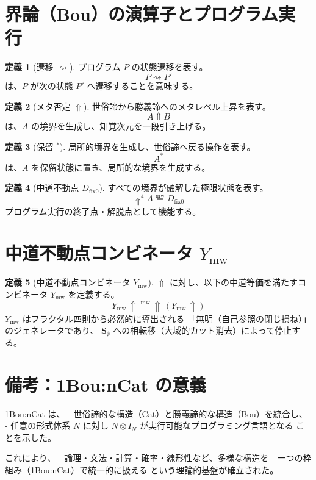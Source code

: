 \documentclass[11pt,a4paper]{article}
\theoremstyle{definition}
\newtheorem{definition}{定義}[section]
\newcommand{\dfix}{D_{\mathrm{fix}0}} %
\newcommand{\mweq}{\mathrel{\overset{\mathrm{mw}}{=}}}
\newcommand{\metanegation}{\Uparrow}
\newcommand{\Svoid}{\mathbf{S}_{\emptyset}}
\newcommand{\Leadsto}{\rightsquigarrow}
\newcommand{\susp}[1]{#1^*}
\newcommand{\Rmw}{Y_{\mathrm{mw}}}
\begin{document}
\section{界論（Bou）の演算子とプログラム実行}

\begin{definition}[遷移 $\Leadsto$]
プログラム $P$ の状態遷移を表す。
$$P \Leadsto P'$$
は、$P$ が次の状態 $P'$ へ遷移することを意味する。
\end{definition}

\begin{definition}[メタ否定 $\metanegation$]
世俗諦から勝義諦へのメタレベル上昇を表す。
$$A \metanegation B$$
は、$A$ の境界を生成し、知覚次元を一段引き上げる。
\end{definition}

\begin{definition}[保留 $\susp{}$]
局所的境界を生成し、世俗諦へ戻る操作を表す。
$$\susp{A}$$
は、$A$ を保留状態に置き、局所的な境界を生成する。
\end{definition}

\begin{definition}[中道不動点 $\dfix$]
すべての境界が融解した極限状態を表す。
$$\metanegation^4 A \mweq \dfix$$
プログラム実行の終了点・解脱点として機能する。
\end{definition}

\section{中道不動点コンビネータ $\Rmw$}

\begin{definition}[中道不動点コンビネータ $\Rmw$]
$\metanegation$ に対し、以下の中道等価を満たすコンビネータ $\Rmw$ を定義する。
$$\Rmw\, \metanegation \mweq \metanegation\,(\Rmw\, \metanegation)$$
$\Rmw$ はフラクタル四則から必然的に導出される
「無明（自己参照の閉じ損ね）」のジェネレータであり、
$\Svoid$ への相転移（大域的カット消去）によって停止する。
\end{definition}

\section*{備考：1Bou:nCat の意義}

1Bou:nCat は、
- 世俗諦的な構造（Cat）と勝義諦的な構造（Bou）を統合し、
- 任意の形式体系 $N$ に対し $N \otimes I_N$ が実行可能なプログラミング言語となる
ことを示した。

これにより、
- 論理・文法・計算・確率・線形性など、多様な構造を
- 一つの枠組み（1Bou:nCat）で統一的に扱える
という理論的基盤が確立された。
\end{document}
